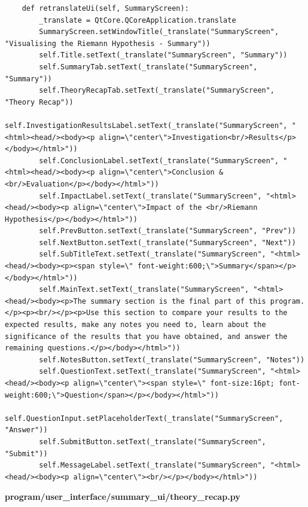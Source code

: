 \documentclass{article}
\begin{document}
\begin{lstlisting}
    def retranslateUi(self, SummaryScreen):
        _translate = QtCore.QCoreApplication.translate
        SummaryScreen.setWindowTitle(_translate("SummaryScreen", "Visualising the Riemann Hypothesis - Summary"))
        self.Title.setText(_translate("SummaryScreen", "Summary"))
        self.SummaryTab.setText(_translate("SummaryScreen", "Summary"))
        self.TheoryRecapTab.setText(_translate("SummaryScreen", "Theory Recap"))
        self.InvestigationResultsLabel.setText(_translate("SummaryScreen", "<html><head/><body><p align=\"center\">Investigation<br/>Results</p></body></html>"))
        self.ConclusionLabel.setText(_translate("SummaryScreen", "<html><head/><body><p align=\"center\">Conclusion & <br/>Evaluation</p></body></html>"))
        self.ImpactLabel.setText(_translate("SummaryScreen", "<html><head/><body><p align=\"center\">Impact of the <br/>Riemann Hypothesis</p></body></html>"))
        self.PrevButton.setText(_translate("SummaryScreen", "Prev"))
        self.NextButton.setText(_translate("SummaryScreen", "Next"))
        self.SubTitleText.setText(_translate("SummaryScreen", "<html><head/><body><p><span style=\" font-weight:600;\">Summary</span></p></body></html>"))
        self.MainText.setText(_translate("SummaryScreen", "<html><head/><body><p>The summary section is the final part of this program.</p><p><br/></p><p>Use this section to compare your results to the expected results, make any notes you need to, learn about the significance of the results that you have obtained, and answer the remaining questions.</p></body></html>"))
        self.NotesButton.setText(_translate("SummaryScreen", "Notes"))
        self.QuestionText.setText(_translate("SummaryScreen", "<html><head/><body><p align=\"center\"><span style=\" font-size:16pt; font-weight:600;\">Question</span></p></body></html>"))
        self.QuestionInput.setPlaceholderText(_translate("SummaryScreen", "Answer"))
        self.SubmitButton.setText(_translate("SummaryScreen", "Submit"))
        self.MessageLabel.setText(_translate("SummaryScreen", "<html><head/><body><p align=\"center\"><br/></p></body></html>"))
\end{lstlisting}

\textbf{program/user\_interface/summary\_ui/theory\_recap.py}
\end{document}
